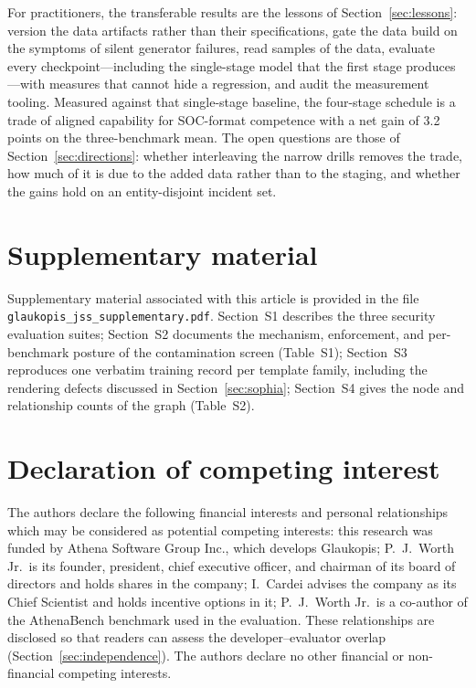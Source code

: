 \documentclass[a4paper,fleqn]{cas-dc}
\begin{document}
For practitioners, the transferable results are the lessons of Section~\ref{sec:lessons}: version the data artifacts rather than their specifications, gate the data build on the symptoms of silent generator failures, read samples of the data, evaluate every checkpoint---including the single-stage model that the first stage produces---with measures that cannot hide a regression, and audit the measurement tooling. Measured against that single-stage baseline, the four-stage schedule is a trade of aligned capability for SOC-format competence with a net gain of 3.2 points on the three-benchmark mean. The open questions are those of Section~\ref{sec:directions}: whether interleaving the narrow drills removes the trade, how much of it is due to the added data rather than to the staging, and whether the gains hold on an entity-disjoint incident set.


\section*{Supplementary material}
Supplementary material associated with this article is provided in the file \texttt{glaukopis\_jss\_supplementary.pdf}. Section~S1 describes the three security evaluation suites; Section~S2 documents the mechanism, enforcement, and per-benchmark posture of the contamination screen (Table~S1); Section~S3 reproduces one verbatim training record per template family, including the rendering defects discussed in Section~\ref{sec:sophia}; Section~S4 gives the node and relationship counts of the graph (Table~S2).

\printcredits

\section*{Declaration of competing interest}
The authors declare the following financial interests and personal relationships which may be considered as potential competing interests: this research was funded by Athena Software Group Inc., which develops Glaukopis; P.~J.~Worth Jr.\ is its founder, president, chief executive officer, and chairman of its board of directors and holds shares in the company; I.~Cardei advises the company as its Chief Scientist and holds incentive options in it; P.~J.~Worth Jr.\ is a co-author of the AthenaBench benchmark used in the evaluation. These relationships are disclosed so that readers can assess the developer--evaluator overlap (Section~\ref{sec:independence}). The authors declare no other financial or non-financial competing interests.
\end{document}
